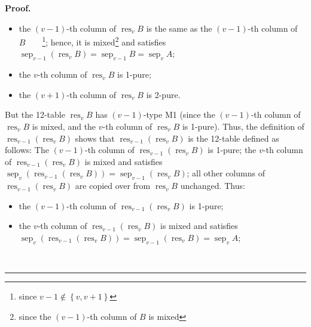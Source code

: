 \documentclass[numbers=enddot,12pt,final,onecolumn,notitlepage]{scrartcl}%
\theoremstyle{definition}
\newenvironment{proof}[1][Proof]{\noindent\textbf{#1.} }{\ \rule{0.5em}{0.5em}}
\newenvironment{verlong}{}{}
\begin{document}
\begin{verlong}
\begin{proof}
\begin{itemize}
\item the $\left(  v-1\right)  $-th column of $\operatorname*{res}%
\nolimits_{v}B$ is the same as the $\left(  v-1\right)  $-th column of
$B$\ \ \ \ \footnote{since $v-1\notin\left\{  v,v+1\right\}  $}; hence, it is
mixed\footnote{since the $\left(  v-1\right)  $-th column of $B$ is mixed} and
satisfies $\operatorname*{sep}\nolimits_{v-1}\left(  \operatorname*{res}%
\nolimits_{v}B\right)  =\operatorname*{sep}\nolimits_{v-1}%
B=\operatorname*{sep}\nolimits_{v}A$;

\item the $v$-th column of $\operatorname*{res}\nolimits_{v}B$ is 1-pure;

\item the $\left(  v+1\right)  $-th column of $\operatorname*{res}%
\nolimits_{v}B$ is 2-pure.
\end{itemize}

But the 12-table $\operatorname*{res}\nolimits_{v}B$ has $\left(  v-1\right)
$-type M1 (since the $\left(  v-1\right)  $-th column of $\operatorname*{res}%
\nolimits_{v}B$ is mixed, and the $v$-th column of $\operatorname*{res}%
\nolimits_{v}B$ is 1-pure). Thus, the definition of $\operatorname*{res}%
\nolimits_{v-1}\left(  \operatorname*{res}\nolimits_{v}B\right)  $ shows that
$\operatorname*{res}\nolimits_{v-1}\left(  \operatorname*{res}\nolimits_{v}%
B\right)  $ is the 12-table defined as follows: The $\left(  v-1\right)  $-th
column of $\operatorname*{res}\nolimits_{v-1}\left(  \operatorname*{res}%
\nolimits_{v}B\right)  $ is 1-pure; the $v$-th column of $\operatorname*{res}%
\nolimits_{v-1}\left(  \operatorname*{res}\nolimits_{v}B\right)  $ is mixed
and satisfies $\operatorname*{sep}\nolimits_{v}\left(  \operatorname*{res}%
\nolimits_{v-1}\left(  \operatorname*{res}\nolimits_{v}B\right)  \right)
=\operatorname*{sep}\nolimits_{v-1}\left(  \operatorname*{res}\nolimits_{v}%
B\right)  $; all other columns of $\operatorname*{res}\nolimits_{v-1}\left(
\operatorname*{res}\nolimits_{v}B\right)  $ are copied over from
$\operatorname*{res}\nolimits_{v}B$ unchanged. Thus:

\begin{itemize}
\item the $\left(  v-1\right)  $-th column of $\operatorname*{res}%
\nolimits_{v-1}\left(  \operatorname*{res}\nolimits_{v}B\right)  $ is 1-pure;

\item the $v$-th column of $\operatorname*{res}\nolimits_{v-1}\left(
\operatorname*{res}\nolimits_{v}B\right)  $ is mixed and satisfies
$\operatorname*{sep}\nolimits_{v}\left(  \operatorname*{res}\nolimits_{v-1}%
\left(  \operatorname*{res}\nolimits_{v}B\right)  \right)
=\operatorname*{sep}\nolimits_{v-1}\left(  \operatorname*{res}\nolimits_{v}%
B\right)  =\operatorname*{sep}\nolimits_{v}A$;


\end{itemize}
\end{proof}
\end{verlong}
\end{document}
